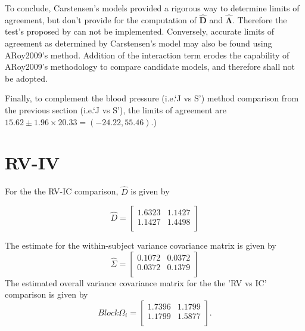 \documentclass[12pt, a4paper]{report}
\theoremstyle{plain}
\theoremstyle{definition}
\theoremstyle{remark}
\begin{document}
	To conclude, Carstensen's models provided a rigorous way to determine limits of agreement, but don't provide for the computation of $\boldsymbol{\hat{D}}$ and $\boldsymbol{\hat{\Lambda}}$. Therefore the test's proposed by \citet{ARoy2009} can not be implemented. Conversely, accurate limits of agreement as determined by Carstensen's model may also be found using ARoy2009's method. Addition of the interaction term erodes the capability of ARoy2009's methodology to compare candidate models, and therefore shall not be adopted.
	
	Finally, to complement the blood pressure (i.e.`J vs S') method comparison from the previous section (i.e.`J vs S'), the limits of agreement are $15.62 \pm 1.96 \times 20.33 = (-24.22, 55.46)$.)
	
	
	
	
	
	
	
	
	
	\section{RV-IV}
	For the the RV-IC comparison, $\hat{D}$ is given by
	
	
	\begin{equation}
	\hat{D}= \left[ \begin{array}{cc}
	1.6323 & 1.1427  \\
	1.1427 & 1.4498 \\
	\end{array} \right]
	\end{equation}
	
	The estimate for the within-subject variance covariance matrix is
	given by
	\begin{equation}
	\hat{\Sigma}= \left[ \begin{array}{cc}
	0.1072 & 0.0372  \\
	0.0372 & 0.1379  \\
	\end{array}\right]
	\end{equation}
	The estimated overall variance covariance matrix for the the 'RV
	vs IC' comparison is given by
	\begin{equation}
	Block \Omega_{i}= \left[ \begin{array}{cc}
	1.7396 & 1.1799  \\
	1.1799 & 1.5877  \\
	\end{array} \right].
	\end{equation}
	
\end{document}
